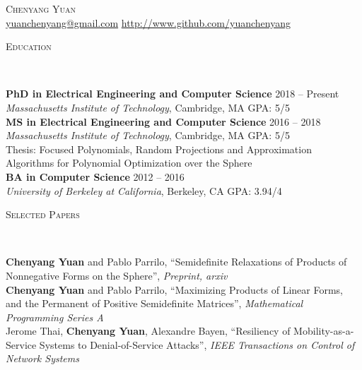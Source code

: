 \documentclass[9pt]{article}
\newenvironment{changemargin}[2]{%
  \begin{list}{}{%
      \setlength{\topsep}{0pt}%
      \setlength{\leftmargin}{#1}%
      \setlength{\rightmargin}{#2}%
      \setlength{\listparindent}{\parindent}%
      \setlength{\itemindent}{\parindent}%
      \setlength{\parsep}{\parskip}%
    }%
  \item[]}{\end{list}
}
\newcommand{\lineover}{
  \begin{changemargin}{-0.05in}{-0.05in}
    \vspace*{-8pt}
    \hrulefill \\
    \vspace*{-2pt}
  \end{changemargin}
}
\newcommand{\header}[1]{
  \begin{changemargin}{-0.5in}{-0.5in}
    \scshape{#1}\\
    \lineover
  \end{changemargin}
}
\newcommand{\contact}[2]{
  \begin{changemargin}{-0.5in}{-0.5in}
    \begin{center}
      {\Large \scshape {#1}}\\ \smallskip
      {#2}\\ \smallskip
    \end{center}
  \end{changemargin}
}
\newenvironment{body} {
  \vspace*{-16pt}
  \begin{changemargin}{-0.25in}{-0.5in}
  }
  {\end{changemargin}
}
\begin{document}
\contact{Chenyang Yuan}{\url{yuanchenyang@gmail.com}  \quad \url{http://www.github.com/yuanchenyang} %
}

\header{Education}
\begin{body}
  \vspace{14pt}
  \textbf{PhD in Electrical Engineering and Computer Science } \hfill  2018 -- Present\\
  \emph{Massachusetts Institute of Technology}, Cambridge, MA{} \hfill GPA: 5/5 \\

  \vspace{5pt}
  \textbf{MS in Electrical Engineering and Computer Science } \hfill  2016 -- 2018 \\
  \emph{Massachusetts Institute of Technology}, Cambridge, MA{} \hfill GPA: 5/5 \\
  Thesis: Focused Polynomials, Random Projections and Approximation Algorithms
  for Polynomial Optimization over the Sphere \\

  \vspace{5pt}
  \textbf{BA in Computer Science} \hfill  2012 -- 2016 \\
  \emph{University of Berkeley at California}, Berkeley, CA{} \hfill GPA: 3.94/4 \\
\end{body}

\smallskip


\header{Selected Papers}

\begin{body}
  \vspace{14pt} \textbf{Chenyang Yuan} and Pablo Parrilo, ``Semidefinite
  Relaxations of Products of
  Nonnegative Forms on the Sphere'', \emph{Preprint, arxiv}\\
  \textbf{Chenyang Yuan} and Pablo Parrilo, ``Maximizing Products of Linear
  Forms, and
  the Permanent of Positive Semidefinite Matrices'', \emph{Mathematical Programming Series A}\\
  Jerome Thai, \textbf{Chenyang Yuan}, Alexandre Bayen, ``Resiliency of
  Mobility-as-a-Service Systems to Denial-of-Service Attacks'', \emph{IEEE
    Transactions on Control of Network Systems}
\end{body}
\smallskip
\end{document}
